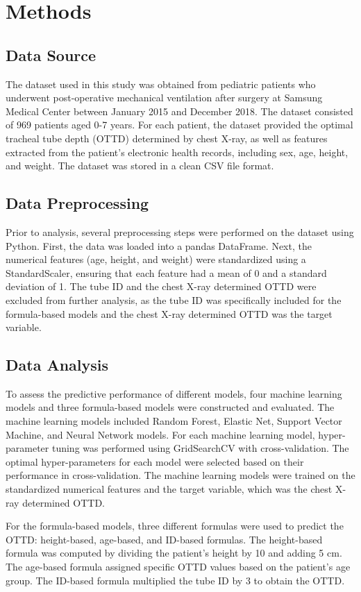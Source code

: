 \documentclass[11pt]{article}
\begin{document}
\section*{Methods}

\subsection*{Data Source}
The dataset used in this study was obtained from pediatric patients who underwent post-operative mechanical ventilation after surgery at Samsung Medical Center between January 2015 and December 2018. The dataset consisted of 969 patients aged 0-7 years. For each patient, the dataset provided the optimal tracheal tube depth (OTTD) determined by chest X-ray, as well as features extracted from the patient's electronic health records, including sex, age, height, and weight. The dataset was stored in a clean CSV file format.

\subsection*{Data Preprocessing}
Prior to analysis, several preprocessing steps were performed on the dataset using Python. First, the data was loaded into a pandas DataFrame. Next, the numerical features (age, height, and weight) were standardized using a StandardScaler, ensuring that each feature had a mean of 0 and a standard deviation of 1. The tube ID and the chest X-ray determined OTTD were excluded from further analysis, as the tube ID was specifically included for the formula-based models and the chest X-ray determined OTTD was the target variable.

\subsection*{Data Analysis}
To assess the predictive performance of different models, four machine learning models and three formula-based models were constructed and evaluated. The machine learning models included Random Forest, Elastic Net, Support Vector Machine, and Neural Network models. For each machine learning model, hyper-parameter tuning was performed using GridSearchCV with cross-validation. The optimal hyper-parameters for each model were selected based on their performance in cross-validation. The machine learning models were trained on the standardized numerical features and the target variable, which was the chest X-ray determined OTTD. 

For the formula-based models, three different formulas were used to predict the OTTD: height-based, age-based, and ID-based formulas. The height-based formula was computed by dividing the patient's height by 10 and adding 5 cm. The age-based formula assigned specific OTTD values based on the patient's age group. The ID-based formula multiplied the tube ID by 3 to obtain the OTTD. 
\end{document}
